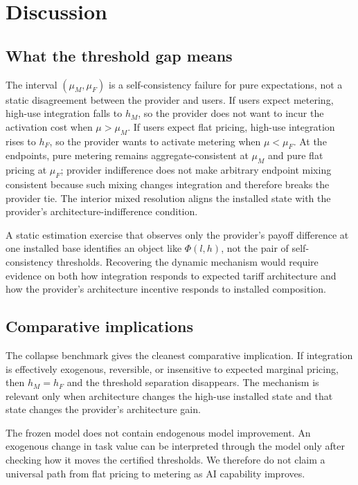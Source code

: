 \section{Discussion}\label{sec:discussion}

\subsection{What the threshold gap means}

The interval $(\mu_M,\mu_F)$ is a self-consistency failure for pure expectations, not a static disagreement between the provider and users. If users expect metering, high-use integration falls to $h_M$, so the provider does not want to incur the activation cost when $\mu>\mu_M$. If users expect flat pricing, high-use integration rises to $h_F$, so the provider wants to activate metering when $\mu<\mu_F$. At the endpoints, pure metering remains aggregate-consistent at $\mu_M$ and pure flat pricing at $\mu_F$; provider indifference does not make arbitrary endpoint mixing consistent because such mixing changes integration and therefore breaks the provider tie. The interior mixed resolution aligns the installed state with the provider's architecture-indifference condition.

A static estimation exercise that observes only the provider's payoff difference at one installed base identifies an object like $\Phi(l,h)$, not the pair of self-consistency thresholds. Recovering the dynamic mechanism would require evidence on both how integration responds to expected tariff architecture and how the provider's architecture incentive responds to installed composition.

\subsection{Comparative implications}

The collapse benchmark gives the cleanest comparative implication. If integration is effectively exogenous, reversible, or insensitive to expected marginal pricing, then $h_M=h_F$ and the threshold separation disappears. The mechanism is relevant only when architecture changes the high-use installed state and that state changes the provider's architecture gain.

The frozen model does not contain endogenous model improvement. An exogenous change in task value can be interpreted through the model only after checking how it moves the certified thresholds. We therefore do not claim a universal path from flat pricing to metering as AI capability improves.

